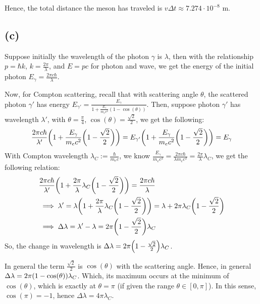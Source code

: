 \documentclass{article}
\DeclarePairedDelimiter{\paran}{(}{)}%
\begin{document}
Hence, the total distance the meson has traveled is $v\Delta t \approx 7.274 \cdot 10^{-8}$ m.

\subsection*{(c)}
Suppose initially the wavelength of the photon $\gamma$ is $\lambda$, then with the relationship $p = \hbar k$, $k = \frac{2\pi}{\lambda}$, and $E = pc$ for photon and wave, we get the energy of the initial photon $E_\gamma = \frac{2\pi c\hbar}{\lambda}$.

Now, for Compton scattering, recall that with scattering angle $\theta$, the scattered photon $\gamma'$ has energy $E_{\gamma'}=\frac{E_\gamma}{1+\frac{E_\gamma}{m_e c^2}(1-\cos(\theta))}$. Then, suppose photon $\gamma'$ has wavelength $\lambda'$, with $\theta = \frac{\pi}{4}$, $\cos(\theta) = \frac{\sqrt{2}}{2}$, we get the following:
\begin{align}
    \frac{2\pi c\hbar}{\lambda'}\paran*{1+\frac{E_\gamma}{m_ec^2}\paran*{1-\frac{\sqrt{2}}{2}}} = E_{\gamma'}\paran*{1+\frac{E_\gamma}{m_ec^2}\paran*{1-\frac{\sqrt{2}}{2}}} = E_\gamma
\end{align}
With Compton wavelength $\lambda_C := \frac{\hbar}{m_ec}$, we know $\frac{E_\gamma}{m_ec^2} = \frac{2\pi c\hbar}{\lambda m_ec^2} = \frac{2\pi}{\lambda} \lambda_C$, we get the following relation:
\begin{align}
    &\frac{2\pi c\hbar}{\lambda'}\paran*{1+\frac{2\pi}{\lambda}\lambda_C\paran*{1-\frac{\sqrt{2}}{2}}} = \frac{2\pi c\hbar}{\lambda}\\
    &\implies \lambda' = \lambda\paran*{1+\frac{2\pi}{\lambda}\lambda_C\paran*{1-\frac{\sqrt{2}}{2}}} = \lambda + 2\pi \lambda_C\paran*{1-\frac{\sqrt{2}}{2}}\\
    &\implies \Delta \lambda = \lambda' - \lambda = 2\pi\paran*{1-\frac{\sqrt{2}}{2}}\lambda_C
\end{align}
So, the change in wavelength is $\Delta \lambda=2\pi\paran*{1-\frac{\sqrt{2}}{2}}\lambda_C$.

\hfil

In general the term $\frac{\sqrt{2}}{2}$ is $\cos(\theta)$ with the scattering angle. Hence, in general $\Delta \lambda = 2\pi\paran*{1-\cos(\theta)}\lambda_C$. Which, its maximum occurs at the minimum of $\cos(\theta)$, which is exactly at $\theta=\pi$ (if given the range $\theta\in [0,\pi]$). In this sense, $\cos(\pi)=-1$, hence $\Delta \lambda=4\pi\lambda_C$.

\break
\end{document}
